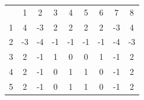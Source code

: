 \documentclass[12pt,a4paper,bibliography=totocnumbered,listof=totocnumbered]{article}
\begin{document}
\begin{figure}[h]
\centering
\begin{tabular}{ccccccccc}
                       & 1                                               & 2                                               & 3                                               & 4                                               & 5                                               & 6                                               & 7                                               & 8                                               \\ \cline{2-9} 
\multicolumn{1}{c|}{1} & \multicolumn{1}{c|}{\cellcolor[HTML]{32CB00}4}  & \multicolumn{1}{c|}{\cellcolor[HTML]{F8A102}-3} & \multicolumn{1}{c|}{\cellcolor[HTML]{34FF34}2}  & \multicolumn{1}{c|}{\cellcolor[HTML]{34FF34}2}  & \multicolumn{1}{c|}{\cellcolor[HTML]{34FF34}2}  & \multicolumn{1}{c|}{\cellcolor[HTML]{34FF34}2}  & \multicolumn{1}{c|}{\cellcolor[HTML]{F8A102}-3} & \multicolumn{1}{c|}{\cellcolor[HTML]{32CB00}4}  \\ \cline{2-9} 
\multicolumn{1}{c|}{2} & \multicolumn{1}{c|}{\cellcolor[HTML]{F8A102}-3} & \multicolumn{1}{c|}{\cellcolor[HTML]{FE0000}-4} & \multicolumn{1}{c|}{\cellcolor[HTML]{FFFE65}-1} & \multicolumn{1}{c|}{\cellcolor[HTML]{FFFE65}-1} & \multicolumn{1}{c|}{\cellcolor[HTML]{FFFE65}-1} & \multicolumn{1}{c|}{\cellcolor[HTML]{FFFE65}-1} & \multicolumn{1}{c|}{\cellcolor[HTML]{FE0000}-4} & \multicolumn{1}{c|}{\cellcolor[HTML]{F8A102}-3} \\ \cline{2-9} 
\multicolumn{1}{c|}{3} & \multicolumn{1}{c|}{\cellcolor[HTML]{34FF34}2}  & \multicolumn{1}{c|}{\cellcolor[HTML]{FFFE65}-1} & \multicolumn{1}{c|}{\cellcolor[HTML]{9AFF99}1}  & \multicolumn{1}{c|}{0}                          & \multicolumn{1}{c|}{0}                          & \multicolumn{1}{c|}{\cellcolor[HTML]{9AFF99}1}  & \multicolumn{1}{c|}{\cellcolor[HTML]{FFFE65}-1} & \multicolumn{1}{c|}{\cellcolor[HTML]{34FF34}2}  \\ \cline{2-9} 
\multicolumn{1}{c|}{4} & \multicolumn{1}{c|}{\cellcolor[HTML]{34FF34}2}  & \multicolumn{1}{c|}{\cellcolor[HTML]{FFFE65}-1} & \multicolumn{1}{c|}{0}                          & \multicolumn{1}{c|}{\cellcolor[HTML]{9AFF99}1}  & \multicolumn{1}{c|}{\cellcolor[HTML]{9AFF99}1}  & \multicolumn{1}{c|}{0}                          & \multicolumn{1}{c|}{\cellcolor[HTML]{FFFE65}-1} & \multicolumn{1}{c|}{\cellcolor[HTML]{34FF34}2}  \\ \cline{2-9} 
\multicolumn{1}{c|}{5} & \multicolumn{1}{c|}{\cellcolor[HTML]{34FF34}2}  & \multicolumn{1}{c|}{\cellcolor[HTML]{FFFE65}-1} & \multicolumn{1}{c|}{0}                          & \multicolumn{1}{c|}{\cellcolor[HTML]{9AFF99}1}  & \multicolumn{1}{c|}{\cellcolor[HTML]{9AFF99}1}  & \multicolumn{1}{c|}{0}                          & \multicolumn{1}{c|}{\cellcolor[HTML]{FFFE65}-1} & \multicolumn{1}{c|}{\cellcolor[HTML]{34FF34}2}  \\ \cline{2-9} 

\end{tabular}
\end{figure}
\end{document}

